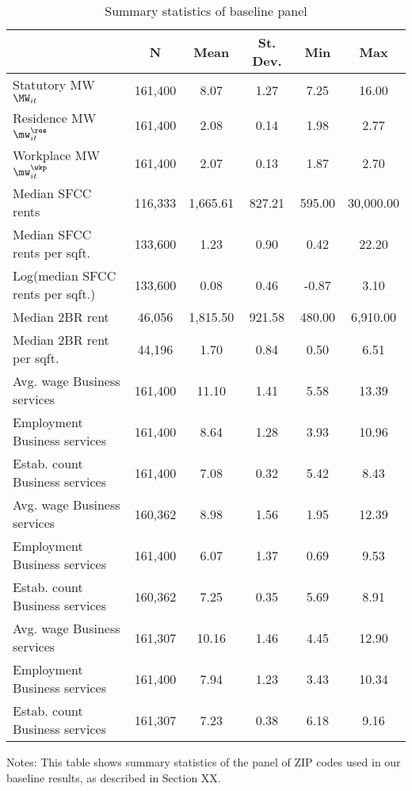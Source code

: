 \begin{table}[hbt!] \centering
    \caption{Summary statistics of baseline panel}
    \label{tab:stats_est_panel}
    \begin{tabular}{@{}lccccc@{}}
        \toprule
                                         & \multicolumn{1}{c}{N} 
                                         & \multicolumn{1}{c}{Mean} 
                                         & \multicolumn{1}{c}{St. Dev.} 
                                         & \multicolumn{1}{c}{Min} 
                                         & \multicolumn{1}{c}{Max}          \\ \midrule
        Statutory MW $\MW_{it}$          & 161,400 & 8.07 & 1.27 & 7.25 & 16.00 \\
        Residence MW $\mw^{\res}_{it}$   & 161,400 & 2.08 & 0.14 & 1.98 & 2.77 \\
        Workplace MW $\mw^{\wkp}_{it}$   & 161,400 & 2.07 & 0.13 & 1.87 & 2.70 \\
        Median SFCC rents                & 116,333 & 1,665.61 & 827.21 & 595.00 & 30,000.00 \\
        Median SFCC rents per sqft.      & 133,600 & 1.23 & 0.90 & 0.42 & 22.20 \\
        Log(median SFCC rents per sqft.) & 133,600 & 0.08 & 0.46 & -0.87 & 3.10 \\
        Median 2BR rent                  & 46,056 & 1,815.50 & 921.58 & 480.00 & 6,910.00 \\
        Median 2BR rent per sqft.        & 44,196 & 1.70 & 0.84 & 0.50 & 6.51 \\
        Avg. wage Business services      & 161,400 & 11.10 & 1.41 & 5.58 & 13.39 \\
        Employment Business services     & 161,400 & 8.64 & 1.28 & 3.93 & 10.96 \\
        Estab. count Business services   & 161,400 & 7.08 & 0.32 & 5.42 & 8.43 \\
        Avg. wage Business services      & 160,362 & 8.98 & 1.56 & 1.95 & 12.39 \\
        Employment Business services     & 161,400 & 6.07 & 1.37 & 0.69 & 9.53 \\
        Estab. count Business services   & 160,362 & 7.25 & 0.35 & 5.69 & 8.91 \\
        Avg. wage Business services      & 161,307 & 10.16 & 1.46 & 4.45 & 12.90 \\
        Employment Business services     & 161,400 & 7.94 & 1.23 & 3.43 & 10.34 \\
        Estab. count Business services   & 161,307 & 7.23 & 0.38 & 6.18 & 9.16 \\ \bottomrule
    \end{tabular}

    \begin{minipage}{.95\textwidth} \footnotesize
        \vspace{2mm}
        Notes: This table shows summary statistics of the panel of ZIP codes 
        used in our baseline results, as described in Section XX.
    \end{minipage}
\end{table}
